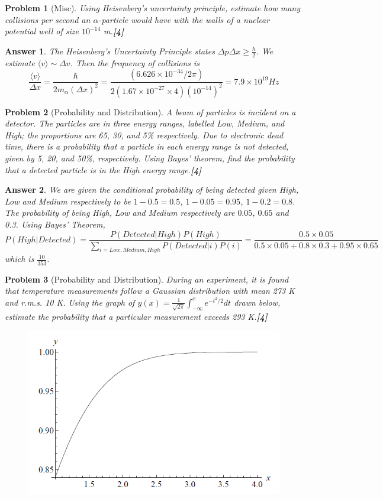 \documentclass[a4paper]{article}
\newtheorem{ans}{Answer}[subsection]
\theoremstyle{new}
\newtheorem{qns}{Problem}[subsection]
\begin{document}
\begin{qns}[Misc]
Using Heisenberg’s uncertainty principle, estimate how many collisions per second an $\alpha$-particle would have with the walls of a nuclear potential well of size $10^{-14}$ m.\hfill\textbf{[4]}
\end{qns}
\begin{ans}
The Heisenberg's Uncertainty Principle states $\Delta p\Delta x\geq\frac{\hbar}{2}$. We estimate $\langle v\rangle\sim\Delta v$. Then the frequency of collisions is
$$\frac{\langle v\rangle}{\Delta x}=\frac{\hbar}{2m_\alpha(\Delta x)^2}=\frac{(6.626\times10^{-34}/2\pi)}{2(1.67\times10^{-27}\times 4)(10^{-14})^2}=7.9\times10^{19}Hz$$
\end{ans}
\newpage
\begin{qns}[Probability and Distribution]
A beam of particles is incident on a detector. The particles are in three energy ranges, labelled Low, Medium, and High; the proportions are 65, 30, and 5\% respectively. Due to electronic dead time, there is a probability that a particle in each energy range is not detected, given by 5, 20, and 50\%, respectively. Using Bayes’ theorem, find the probability that a detected particle is in the High energy range.\hfill\textbf{[4]}
\end{qns}
\begin{ans}
We are given the conditional probability of being detected given High, Low and Medium respectively to be $1-0.5=0.5$, $1-0.05=0.95$, $1-0.2=0.8$. The probability of being High, Low and Medium respectively are $0.05$, $0.65$ and 0.3. Using Bayes' Theorem,
$$P(High|Detected)=\frac{P(Detected|High)P(High)}{\sum_{i=Low,Medium,High}P(Detected|i)P(i)}=\frac{0.5\times 0.05}{0.5\times0.05+0.8\times0.3+0.95\times0.65}$$
which is $\frac{10}{353}$.
\end{ans}
\begin{qns}[Probability and Distribution]
During an experiment, it is found that temperature measurements follow a Gaussian distribution with mean 273 K and r.m.s. 10 K. Using the graph of $y(x)=\frac{1}{\sqrt{2\pi}}\int_{-\infty}^xe^{-t^2/2}dt$ drawn below, estimate the probability that a particular measurement exceeds 293 K.\hfill\textbf{[4]}
\begin{figure}[H]
    \centering
    \includegraphics[scale=0.75]{2014P1A5Q.PNG}
\end{figure}
\end{qns}
\end{document}
